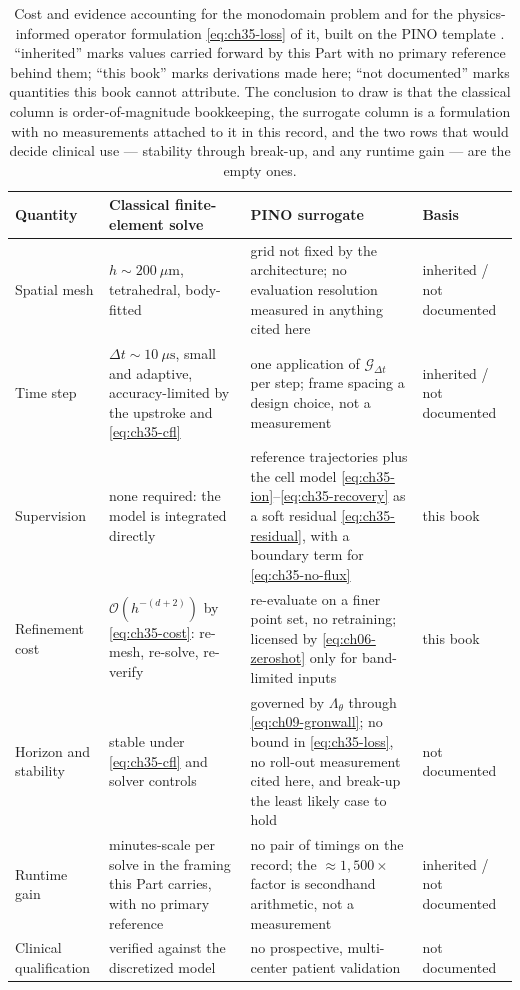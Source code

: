 \begin{table}[t]
\centering
\small
\caption{Cost and evidence accounting for the monodomain problem and for the
physics-informed operator formulation \eqref{eq:ch35-loss} of it, built on the
PINO template \cite{li2021physics}. ``inherited'' marks values carried forward by
this Part with no primary reference behind them; ``this book'' marks
derivations made here; ``not documented'' marks quantities this book cannot
attribute. The conclusion to draw is that the classical column is
order-of-magnitude bookkeeping, the surrogate column is a formulation with no
measurements attached to it in this record, and the two rows that would decide
clinical use --- stability through break-up, and any runtime gain --- are the empty
ones.}
\label{tab:ch35cost}
\begin{tabularx}{\textwidth}{>{\raggedright\arraybackslash}p{2.7cm}>{\raggedright\arraybackslash}X>{\raggedright\arraybackslash}X>{\raggedright\arraybackslash}p{1.75cm}}
\toprule
\textbf{Quantity} & \textbf{Classical finite-element solve} & \textbf{PINO surrogate} & \textbf{Basis} \\
\midrule
Spatial mesh & $h\sim 200\ \mu\text{m}$, tetrahedral, body-fitted & grid not fixed by the architecture; no evaluation resolution measured in anything cited here & inherited / not documented \\
Time step & $\Delta t\sim 10\ \mu\text{s}$, small and adaptive, accuracy-limited by the upstroke and \eqref{eq:ch35-cfl} & one application of $\mathcal{G}_{\Delta t}$ per step; frame spacing a design choice, not a measurement & inherited / not documented \\
Supervision & none required: the model is integrated directly & reference trajectories plus the cell model \eqref{eq:ch35-ion}--\eqref{eq:ch35-recovery} as a soft residual \eqref{eq:ch35-residual}, with a boundary term for \eqref{eq:ch35-no-flux} & this book \\
Refinement cost & $\mathcal{O}(h^{-(d+2)})$ by \eqref{eq:ch35-cost}: re-mesh, re-solve, re-verify & re-evaluate on a finer point set, no retraining; licensed by \eqref{eq:ch06-zeroshot} only for band-limited inputs & this book \\
Horizon and stability & stable under \eqref{eq:ch35-cfl} and solver controls & governed by $\Lambda_\theta$ through \eqref{eq:ch09-gronwall}; no bound in \eqref{eq:ch35-loss}, no roll-out measurement cited here, and break-up the least likely case to hold & not documented \\
Runtime gain & minutes-scale per solve in the framing this Part carries, with no primary reference & no pair of timings on the record; the $\approx1{,}500\times$ factor is secondhand arithmetic, not a measurement & inherited / not documented \\
Clinical qualification & verified against the discretized model & no prospective, multi-center patient validation & not documented \\
\bottomrule
\end{tabularx}
\end{table}

